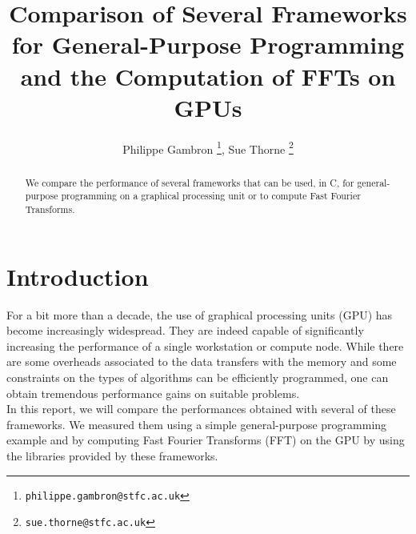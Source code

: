 \documentclass[12pt, a4paper]{article}
\date{}
\begin{document}
\title{Comparison of Several Frameworks for General-Purpose Programming and the  Computation of FFTs on GPUs}
\author{Philippe Gambron \thanks{\texttt{philippe.gambron{@}stfc.ac.uk}}, Sue Thorne \thanks{\texttt{sue.thorne{@}stfc.ac.uk}}}
\maketitle
\begin{abstract}
We compare the performance of several frameworks that can be used, in C, for general-purpose programming on a graphical processing unit or to compute Fast Fourier Transforms.  
\end{abstract}
\section{Introduction}
For a bit more than a decade, the use of graphical processing units (GPU) has become increasingly widespread. They are indeed capable of significantly increasing the performance of a single workstation or compute node. While there are some overheads associated to the data transfers with the memory and some constraints on the types of algorithms can be efficiently programmed, one can obtain tremendous performance gains on suitable problems.\\

In this report, we will compare the performances obtained with several of these frameworks.  We measured them using a simple general-purpose programming example and by computing Fast Fourier Transforms (FFT) on the GPU by using the libraries provided by these frameworks. 
\end{document}
